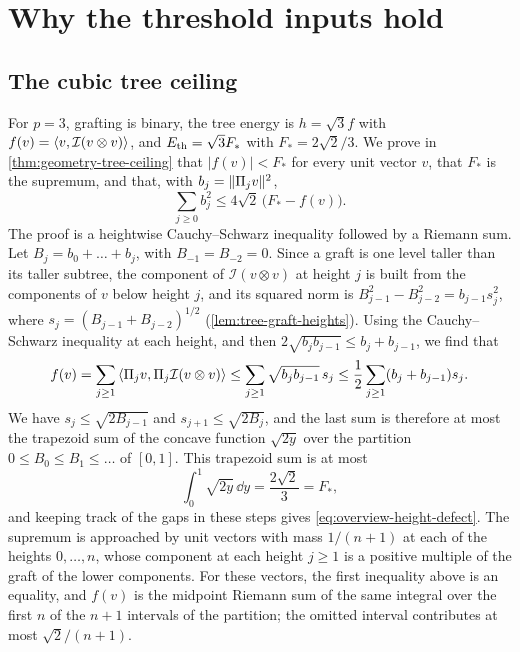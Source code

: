 \section{Why the threshold inputs hold}\label{sec:overview-inputs}

\subsection{The cubic tree ceiling}
For $p=3$, grafting is binary, the tree energy is $h=\sqrt3f$ with $f(v)=\left\langle v,\mathcal I(v\otimes v)\right\rangle$, and $E_{\mathrm{th}}=\sqrt3F_*$ with $F_*=2\sqrt2/3$. We prove in \cref{thm:geometry-tree-ceiling} that $|f(v)|<F_*$ for every unit vector $v$, that $F_*$ is the supremum, and that, with $b_j=\lVert\Pi_jv\rVert^2$,
\begin{equation}\label{eq:overview-height-defect}
 \sum_{j\ge0}b_j^2\le4\sqrt2\,\bigl(F_*-f(v)\bigr).
\end{equation}
The proof is a heightwise Cauchy--Schwarz inequality followed by a Riemann sum. Let $B_j=b_0+\dots+b_j$, with $B_{-1}=B_{-2}=0$. Since a graft is one level taller than its taller subtree, the component of $\mathcal I(v\otimes v)$ at height $j$ is built from the components of $v$ below height $j$, and its squared norm is $B_{j-1}^2-B_{j-2}^2=b_{j-1}s_j^2$, where $s_j=(B_{j-1}+B_{j-2})^{1/2}$ (\cref{lem:tree-graft-heights}). Using the Cauchy--Schwarz inequality at each height, and then $2\sqrt{b_jb_{j-1}}\le b_j+b_{j-1}$, we find that
\[
 f(v)=\sum_{j\ge1}\left\langle\Pi_jv,\Pi_j\mathcal I(v\otimes v)\right\rangle
 \le\sum_{j\ge1}\sqrt{b_jb_{j-1}}\,s_j
 \le\frac12\sum_{j\ge1}(b_j+b_{j-1})s_j .
\]
We have $s_j\le\sqrt{2B_{j-1}}$ and $s_{j+1}\le\sqrt{2B_j}$, and the last sum is therefore at most the trapezoid sum of the concave function $\sqrt{2y}$ over the partition $0\le B_0\le B_1\le\dots$ of $[0,1]$. This trapezoid sum is at most
\[
 \int_0^1\sqrt{2y}\,\dd y=\frac{2\sqrt2}3=F_* ,
\]
and keeping track of the gaps in these steps gives \eqref{eq:overview-height-defect}. The supremum is approached by unit vectors with mass $1/(n+1)$ at each of the heights $0,\dots,n$, whose component at each height $j\ge1$ is a positive multiple of the graft of the lower components. For these vectors, the first inequality above is an equality, and $f(v)$ is the midpoint Riemann sum of the same integral over the first $n$ of the $n+1$ intervals of the partition; the omitted interval contributes at most $\sqrt2/(n+1)$.

